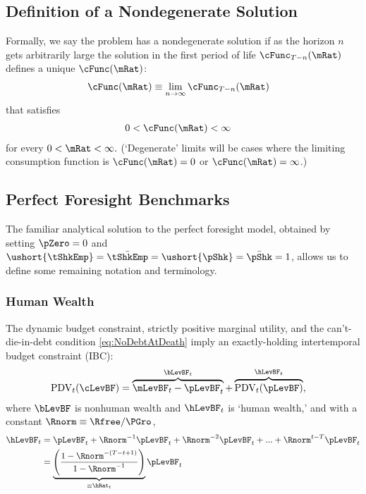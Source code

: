 \documentclass[BufferStockTheory]{subfiles}
\begin{document}
\hypertarget{Definition-of-a-Nondegenerate-Solution}{}
\subsection{Definition of a Nondegenerate Solution}

Formally, we say the problem has a nondegenerate solution if as the horizon $n$ gets arbitrarily large the solution in the first period of life $\cFunc_{T-n}(\mRat)$ defines a unique $\cFunc(\mRat)$:
\begin{align}
  \cFunc(\mRat)  & \equiv  \lim_{n \rightarrow \infty} \cFunc_{T-n}(\mRat)
\end{align}
that satisfies
\begin{align}
  0 & < \cFunc(\mRat) <  \infty 
\end{align}
for every $0 < \mRat < \infty.$ (`Degenerate' limits will be cases where the limiting consumption function is $\cFunc(\mRat)=0$ or $\cFunc(\mRat)=\infty$.)

\hypertarget{Perfect-Foresight-Benchmarks}{}
\subsection{Perfect Foresight Benchmarks}

The familiar analytical solution to the perfect foresight model, obtained by setting $\pZero=0$ and $\ushort{\tShkEmp}=\bar{\tShkEmp}=\ushort{\pShk}=\bar{\pShk}=1$, allows us to define some remaining notation and terminology.

\hypertarget{Human-Wealth}{}
\subsubsection{Human Wealth}
The dynamic budget constraint, strictly positive marginal utility, and the can't-die-in-debt condition \eqref{eq:NoDebtAtDeath} imply an exactly-holding intertemporal budget constraint (IBC):
\begin{align}
  \text{PDV}_{t}(\cLevBF)  & = \overbrace{\mLevBF_{t}-\pLevBF_{t}}^{\bLevBF_{t}}+\overbrace{\text{PDV}_{t}(\pLevBF)}^{\hLevBF_{t}}, \label{eq:IBCFinite}
\end{align} \hypertarget{FHWF}{}
where $\bLevBF$ is nonhuman wealth and $\hLevBF_{t}$ is `human wealth,' and with a constant $\Rnorm \equiv \Rfree/\PGro$,
\begin{align}
  \hLevBF_{t}  & = \pLevBF_{t}+\Rnorm^{-1} \pLevBF_{t} + \Rnorm^{-2} \pLevBF_{t} + ... + \Rnorm^{t-T} \pLevBF_{t} \notag 
  \\  & = \underbrace{\left(\frac{1-\Rnorm^{-(T-t+1)}}{1-\Rnorm^{-1}}\right)}_{\equiv \hRat_{t}}\pLevBF_{t} \label{eq:HDef}
\end{align}
\end{document}
